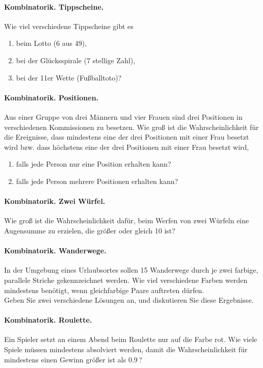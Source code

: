 \paragraph{Kombinatorik. Tippscheine.}
Wie viel verschiedene Tippscheine gibt es
\begin{enumerate}
\item beim Lotto (6 aus 49),
\item bei der Glücksspirale (7 stellige Zahl),
\item bei der 11er Wette (Fußballtoto)?
\end{enumerate}


\paragraph{Kombinatorik. Positionen.}
Aus einer Gruppe von drei Männern und vier Frauen sind drei Positionen in verschiedenen Kommissionen zu besetzen. Wie groß ist die Wahrscheinlichkeit für die Ereignisse, dass mindestens eine der drei Positionen mit einer Frau besetzt wird bzw. dass höchstens eine der drei Positionen mit einer Frau besetzt wird,
\begin{enumerate}
\item falls jede Person nur eine Position erhalten kann?
\item falls jede Person mehrere Positionen erhalten kann?
\end{enumerate}


\paragraph{Kombinatorik. Zwei Würfel.}
Wie groß ist die Wahrscheinlichkeit dafür, beim Werfen von zwei Würfeln eine
Augensumme zu erzielen, die größer oder gleich 10 ist?


\paragraph{Kombinatorik. Wanderwege.}
In der Umgebung eines Urlaubsortes sollen 15 Wanderwege durch je zwei farbige,
parallele Striche gekennzeichnet werden. Wie viel verschiedene Farben werden
mindestens benötigt, wenn gleichfarbige Paare auftreten dürfen.\\
Geben Sie zwei verschiedene Lösungen an, und diskutieren Sie diese
Ergebnisse.


\paragraph{Kombinatorik. Roulette.}
Ein Spieler setzt an einem Abend beim Roulette nur auf die Farbe rot. Wie viele
Spiele müssen mindestens absolviert werden, damit die Wahrscheinlichkeit für
mindestens einen Gewinn größer ist als 0.9\,?


